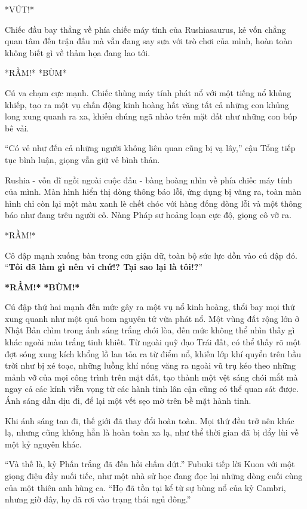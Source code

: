\documentclass[../main.tex]{subfiles}
\begin{document}
*VÚT!*

Chiếc đầu bay thẳng về phía chiếc máy tính của Rushiasaurus, kẻ vốn chẳng quan tâm đến trận đấu mà vẫn đang say sưa với trò chơi của mình, hoàn toàn không biết gì về thảm họa đang lao tới.

*RẦM!* *BÙM*

Cú va chạm cực mạnh. Chiếc thùng máy tính phát nổ với một tiếng nổ khủng khiếp, tạo ra một vụ chấn động kinh hoàng hất văng tất cả những con khủng long xung quanh ra xa, khiến chúng ngã nhào trên mặt đất như những con búp bê vải.

``Có vẻ như đến cả những người không liên quan cũng bị vạ lây,'' cậu Tổng tiếp tục bình luận, giọng vẫn giữ vẻ bình thản.

Rushia - vốn dĩ ngồi ngoài cuộc đấu - bàng hoàng nhìn về phía chiếc máy tính của mình. Màn hình hiển thị dòng thông báo lỗi, ứng dụng bị văng ra, toàn màn hình chỉ còn lại một màu xanh lè chết chóc với hàng đống dòng lỗi và một thông báo như đang trêu người cô. Nàng Pháp sư hoảng loạn cực độ, giọng cô vỡ ra.

*RẦM!*

Cô đập mạnh xuống bàn trong cơn giận dữ, toàn bộ sức lực dồn vào cú đập đó. ``\textbf{Tôi đã làm gì nên vi chứ!? Tại sao lại là tôi!?}''


{\Large \textbf{*RẦM!*} \textbf{*BÙM!*}}

Cú đập thứ hai mạnh đến mức gây ra một vụ nổ kinh hoàng, thổi bay mọi thứ xung quanh như một quả bom nguyên tử vừa phát nổ. Một vùng đất rộng lớn ở Nhật Bản chìm trong ánh sáng trắng chói lòa, đến mức không thể nhìn thấy gì khác ngoài màu trắng tinh khiết. Từ ngoài quỹ đạo Trái đất, có thể thấy rõ một đợt sóng xung kích khổng lồ lan tỏa ra từ điểm nổ, khiến lớp khí quyển trên bầu trời như bị xé toạc, những luồng khí nóng văng ra ngoài vũ trụ kéo theo những mảnh vỡ của mọi công trình trên mặt đất, tạo thành một vệt sáng chói mắt mà ngay cả các kính viễn vọng từ các hành tinh lân cận cũng có thể quan sát được. Ánh sáng dần dịu đi, để lại một vết sẹo mờ trên bề mặt hành tinh.

Khi ánh sáng tan đi, thế giới đã thay đổi hoàn toàn. Mọi thứ đều trở nên khác lạ, nhưng cũng không hẳn là hoàn toàn xa lạ, như thể thời gian đã bị đẩy lùi về một kỷ nguyên khác.

``Và thế là, kỷ Phấn trắng đã đến hồi chấm dứt.'' Fubuki tiếp lời Kuon với một giọng điệu đầy nuối tiếc, như một nhà sử học đang đọc lại những dòng cuối cùng của một thiên anh hùng ca. ``Họ đã tồn tại kể từ sự bùng nổ của kỷ Cambri, nhưng giờ đây, họ đã rơi vào trạng thái ngủ đông.''
\end{document}
